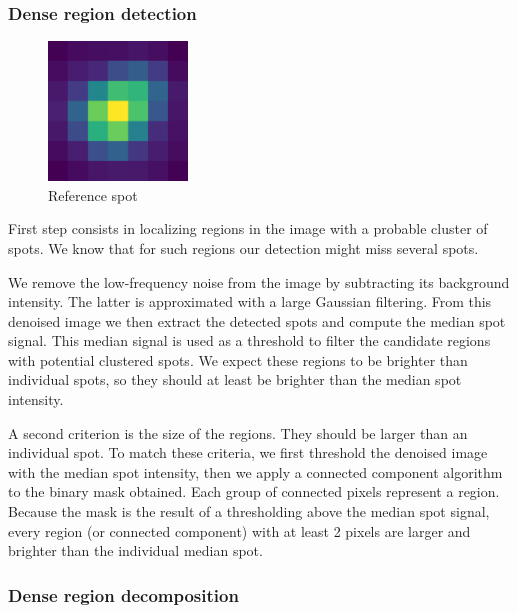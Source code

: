 \subsubsection{Dense region detection}

\begin{figure}
	\begin{center}
		\includegraphics[width=0.33\textwidth]{figures/chapter2/reference_spot}
	\caption{Reference spot}
	\label{fig:reference_spot}
	\end{center}
\end{figure}

First step consists in localizing regions in the image with a probable cluster of spots.
We know that for such regions our detection might miss several spots.

We remove the low-frequency noise from the image by subtracting its background intensity.
The latter is approximated with a large Gaussian filtering.
From this denoised image we then extract the detected spots and compute the median spot signal.
This median signal is used as a threshold to filter the candidate regions with potential clustered spots.
We expect these regions to be brighter than individual spots, so they should at least be brighter than the median spot intensity.

A second criterion is the size of the regions.
They should be larger than an individual spot.
To match these criteria, we first threshold the denoised image with the median spot intensity, then we apply a connected component algorithm\cite{wu_connected_component_2005} to the binary mask obtained.
Each group of connected pixels represent a region.
Because the mask is the result of a thresholding above the median spot signal, every region (or connected component) with at least 2 pixels are larger and brighter than the individual median spot.

\subsubsection{Dense region decomposition}

